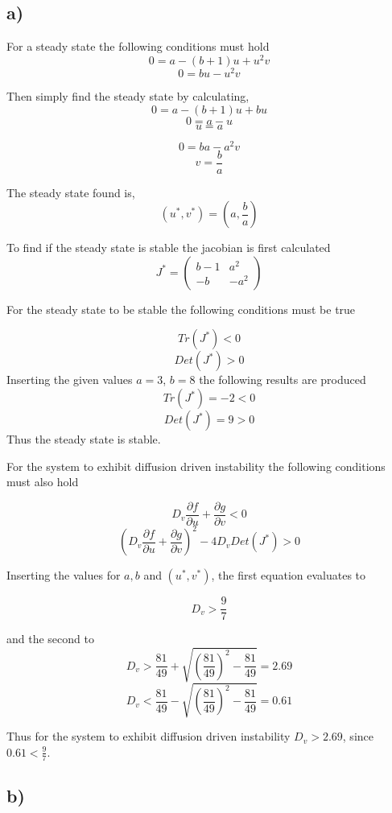 \subsection*{a)}
For a steady state the following conditions must hold
$$0 = a - (b+1)u + u^2v$$
$$0 = bu - u^2v$$

Then simply find the steady state by calculating,
$$0 = a-(b+1)u +bu$$
$$0 = a - u$$
$$u = a$$

$$0 = ba - a^2v$$
$$v = \frac{b}{a}$$

The steady state found is,
$$(u^*, v^*)=\left(a,\frac{b}{a}\right)$$

To find if the steady state is stable the jacobian is first calculated
$$J^* = \left(
\begin{array}{cc}
    b-1 & a^2 \\
    -b  & -a^2
\end{array}
\right)$$

For the steady state to be stable the following conditions must be true

$$Tr(J^*) < 0$$
$$Det(J^*) > 0$$
Inserting the given values $a=3$, $b=8$ the following results are produced
$$Tr(J^*) = -2 < 0$$
$$Det(J^*) = 9 > 0$$
Thus the steady state is stable.

For the system to exhibit diffusion driven instability the following conditions must also hold

$$D_v \frac{\partial f}{\partial u} + \frac{\partial g}{\partial v} < 0$$
$$(D_v \frac{\partial f}{\partial u}+ \frac{\partial g}{\partial v})^2 - 4D_v Det(J^*) > 0$$

Inserting the values for $a, b$ and $(u^*, v^*)$, the first equation evaluates to

$$D_v > \frac{9}{7}$$

and the second to
$$D_v > \frac{81}{49} + \sqrt{\left(\frac{81}{49}\right)^2 - \frac{81}{49}} = 2.69$$
$$D_v < \frac{81}{49} - \sqrt{\left(\frac{81}{49}\right)^2 - \frac{81}{49}} = 0.61$$

Thus for the system to exhibit diffusion driven instability $D_v > 2.69$, since $0.61 < \frac{9}{7}$.


\subsection*{b)}

